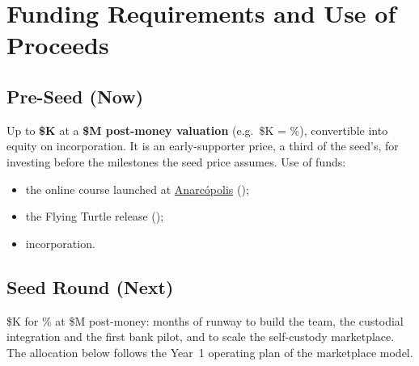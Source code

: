 
\section{Funding Requirements and Use of Proceeds}\label{sec:funding}

\subsection{Pre-Seed (Now)}
Up to \textbf{\$K} at a \textbf{\$M post-money valuation} (e.g.\ \$K = \%), convertible into equity on incorporation. It is an early-supporter price, a third of the seed's, for investing before the milestones the seed price assumes. Use of funds:
\begin{itemize}
  \item the online course launched at \href{\anarcurl}{Anarcópolis} (\masterclassDate);
  \item the Flying Turtle release (\flyingTurtleDate);
  \item incorporation.
\end{itemize}

\subsection{Seed Round (Next)}
\$K for \numint{\seedEquity}\% at \$M post-money: \numint{\seedRunwayMonths} months of runway to build the team, the custodial integration and the first bank pilot, and to scale the self-custody marketplace. The allocation below follows the Year~1 operating plan of the marketplace model.

\newcommand{\seedTotalBase}{\fpeval{\teamSalariesYearOne + \infrastructureYearOne + \legalComplianceYearOne + \marketingBudgetYearOne}}
\newcommand{\seedTeamPct}{\fpeval{round(\teamSalariesYearOne / \seedTotalBase * 100, 0)}}
\newcommand{\seedInfraPct}{\fpeval{round(\infrastructureYearOne / \seedTotalBase * 100, 0)}}
\newcommand{\seedLegalPct}{\fpeval{round(\legalComplianceYearOne / \seedTotalBase * 100, 0)}}
\newcommand{\seedMktPct}{\fpeval{round(\marketingBudgetYearOne / \seedTotalBase * 100, 0)}}

